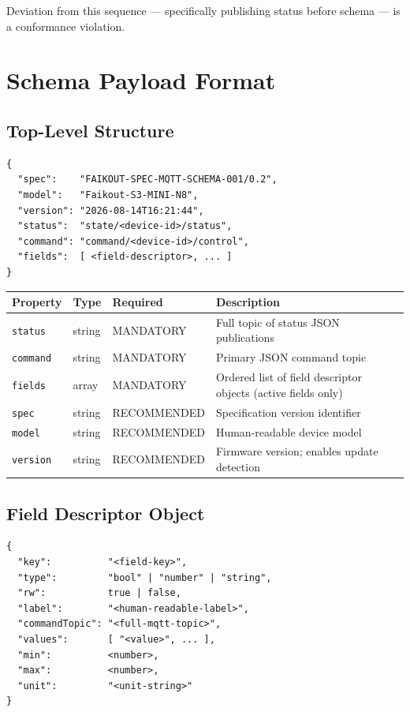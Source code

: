 \documentclass[11pt,a4paper]{article}
\begin{document}
Deviation from this sequence — specifically publishing status before schema — is a conformance violation.

\section{Schema Payload Format}

\subsection{Top-Level Structure}

\begin{lstlisting}[style=json]
{
  "spec":    "FAIKOUT-SPEC-MQTT-SCHEMA-001/0.2",
  "model":   "Faikout-S3-MINI-N8",
  "version": "2026-08-14T16:21:44",
  "status":  "state/<device-id>/status",
  "command": "command/<device-id>/control",
  "fields":  [ <field-descriptor>, ... ]
}
\end{lstlisting}

\begin{tabularx}{\textwidth}{@{}lllX@{}}
\toprule
\textbf{Property} & \textbf{Type} & \textbf{Required} & \textbf{Description} \\
\midrule
\rowcolor{lightbg}
\texttt{status}  & string & MANDATORY    & Full topic of status JSON publications \\
\texttt{command} & string & MANDATORY    & Primary JSON command topic \\
\rowcolor{lightbg}
\texttt{fields}  & array  & MANDATORY    & Ordered list of field descriptor objects (active fields only) \\
\texttt{spec}    & string & RECOMMENDED  & Specification version identifier \\
\rowcolor{lightbg}
\texttt{model}   & string & RECOMMENDED  & Human-readable device model \\
\texttt{version} & string & RECOMMENDED  & Firmware version; enables update detection \\
\bottomrule
\end{tabularx}

\subsection{Field Descriptor Object}

\begin{lstlisting}[style=json]
{
  "key":          "<field-key>",
  "type":         "bool" | "number" | "string",
  "rw":           true | false,
  "label":        "<human-readable-label>",
  "commandTopic": "<full-mqtt-topic>",
  "values":       [ "<value>", ... ],
  "min":          <number>,
  "max":          <number>,
  "unit":         "<unit-string>"
}
\end{lstlisting}
\end{document}
